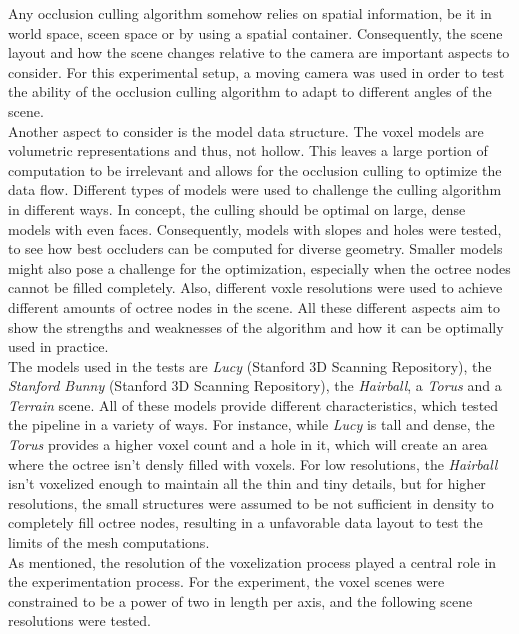 Any occlusion culling algorithm somehow relies on spatial information, be it in world space, sceen space or by 
using a spatial container. Consequently, the scene layout and how the scene changes relative to the camera are 
important aspects to consider. For this experimental setup, a moving camera was used in order to test the ability 
of the occlusion culling algorithm to adapt to different angles of the scene. \\

Another aspect to consider is the model data structure. The voxel models are volumetric representations and thus, 
not hollow. This leaves a large portion of computation to be irrelevant and allows for the occlusion culling to 
optimize the data flow. Different types of models were used to challenge the culling algorithm in different ways. 
In concept, the culling should be optimal on large, dense models with even faces. Consequently, models with 
slopes and holes were tested, to see how best occluders can be computed for diverse geometry. Smaller models might 
also pose a challenge for the optimization, especially when the octree nodes cannot be filled completely. Also, 
different voxle resolutions were used to achieve different amounts of octree nodes in the scene. All these different 
aspects aim to show the strengths and weaknesses of the algorithm and how it can be optimally used in practice. \\

\noindent
The models used in the tests are \emph{Lucy} (Stanford 3D Scanning Repository), the \emph{Stanford Bunny} 
(Stanford 3D Scanning Repository), the \emph{Hairball}, a \emph{Torus} and a \emph{Terrain} scene. All of 
these models provide different characteristics, which tested the pipeline in a variety of ways. For 
instance, while \emph{Lucy} is tall and dense, the \emph{Torus} provides a higher voxel count and a hole 
in it, which will create an area where the octree isn't densly filled with voxels. For low resolutions, 
the \emph{Hairball} isn't voxelized enough to maintain all the thin and tiny details, but for higher 
resolutions, the small structures were assumed to be not sufficient in density to completely fill octree 
nodes, resulting in a unfavorable data layout to test the limits of the mesh computations. \\

\noindent
As mentioned, the resolution of the voxelization process played a central role in the experimentation process.
For the experiment, the voxel scenes were constrained to be a power of two in length per axis, and the following
scene resolutions were tested.

